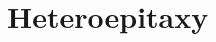 \documentclass[12pt]{book}
\begin{document}
% 
% 
% 
\section{Heteroepitaxy}


\newpage
\sloppy %
\printbibliography
\end{document}
